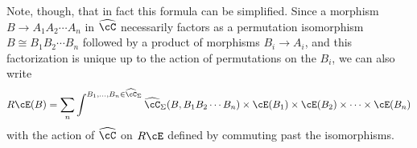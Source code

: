 \documentclass{amsart}
\newcommand{\C}{\cC}
\renewcommand{\Chat}{\ensuremath{\widehat{\C}}\xspace}
\newcommand{\Chats}{\ensuremath{\Chat_{\Sigma}}\xspace}
\newcommand{\E}{\cE}
\begin{document}
Note, though, that in fact this formula can be simplified.
Since a morphism $B\to A_1 A_2 \cdots A_n$ in \Chat necessarily factors as a permutation isomorphism $B\cong B_1 B_2 \cdots B_n$ followed by a product of morphisms $B_i \to A_i$, and this factorization is unique up to the action of permutations on the $B_i$, we can also write
\begin{equation*}
  R\E(B) = \sum_n \int^{B_1,\dots,B_n \in \Chats} 
    \Chats(B,B_1 B_2\cdots B_n)\times \E(B_1)\times \E(B_2)\times\cdots \times \E(B_n)
\end{equation*}
with the action of \Chat on $R\E$ defined by commuting past the isomorphisms.



\end{document}
